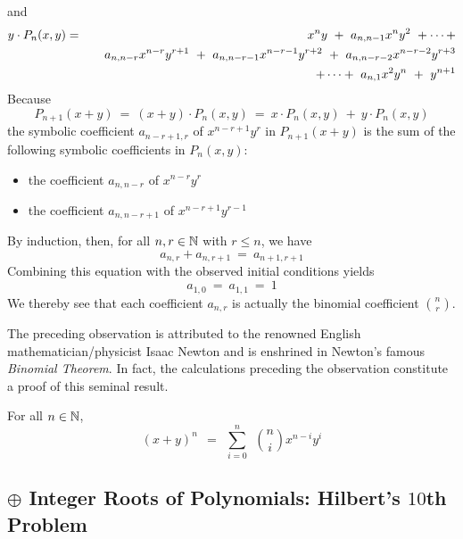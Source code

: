 and
\begin{eqnarray}
\nonumber
y \cdot P_n(x,y) & = &
 x^n y \ + \ a_{n,n-1} x^n y^2 \ + \cdots + \\
\nonumber
         &   & \hspace*{.15in}
a_{n,n-r} x^{n-r} y^{r+1} \ + \ a_{n,n-r-1} x^{n-r-1} y^{r+2}
\ + \ a_{n,n-r-2} x^{n-r-2} y^{r+3} \\
\label{eq:yPk}
         &   & \hspace*{.15in}
+ \cdots  + \ a_{n,1} x^2 y^n \ + \ y^{n+1}
\end{eqnarray}
Because
\[ P_{n+1}(x+y) \ = \ (x+y) \cdot P_n(x,y) \ = \ x \cdot P_n(x,y) \ + \ y \cdot P_n(x,y) \]
the symbolic coefficient $a_{n-r+1,r}$ of $x^{n-r+1} y^r$ in $P_{n+1}(x+y)$ is the sum of the following symbolic coefficients in $P_n(x,y)$:
\begin{itemize}
\item
the coefficient $a_{n,n-r}$ of $x^{n-r}y^r$
\medskip\item
the coefficient $a_{n,n-r+1}$ of $x^{n-r+1}y^{r-1}$
\end{itemize}
By induction, then, for all $n,r \in \mathbb{N}$ with $r \leq n$, we have
\[ a_{n,r} + a_{n,r+1} \ = \ a_{n+1,r+1} \]
Combining this equation with the observed initial conditions yields
\[ a_{1,0} \ = \ a_{1,1} \ = \ 1 \]
We thereby see that each coefficient $a_{n,r}$ is actually the binomial coefficient $\displaystyle {n \choose r}$.

\smallskip

 
The preceding observation is attributed to the renowned English mathematician/physicist Isaac Newton and is enshrined in Newton's famous {\it Binomial Theorem}.  In fact, the calculations preceding the observation constitute a proof of this seminal result.

\begin{theorem}
\label{thm:Binomial-theorem}
For all $n \in \mathbb{N}$,
\begin{equation}
\label{eq:binomial-theorem}
(x+y)^n \ \ = \ \ \sum_{i=0}^n \ \ {n \choose i} x^{n-i} y^i
\end{equation}
\end{theorem}


\subsection{$\oplus$ Integer Roots of Polynomials: Hilbert's $10$th Problem}
\label{sec:Hilberts-Tenth}

